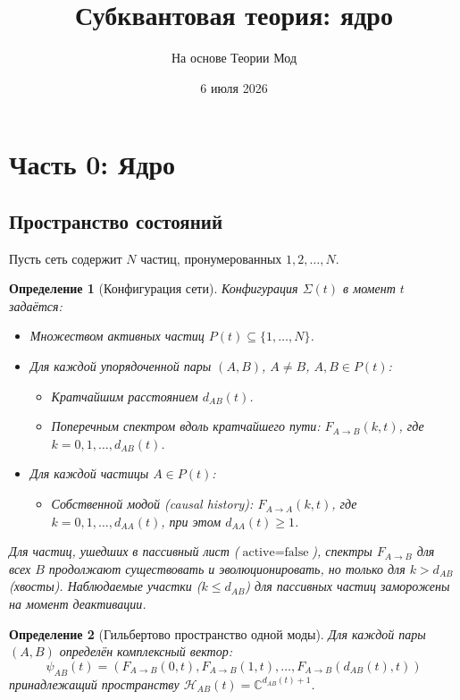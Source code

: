 \documentclass[11pt,a4paper]{article}
\title{Субквантовая теория: ядро}
\author{На основе Теории Мод}
\date{6 июля 2026}
\newtheorem{definition}{Определение}[section]
\theoremstyle{definition}
\begin{document}
\maketitle
\tableofcontents
\newpage

\section{Часть 0: Ядро}

\subsection{Пространство состояний}

Пусть сеть содержит $N$ частиц, пронумерованных $1, 2, \dots, N$.

\begin{definition}[Конфигурация сети]
Конфигурация $\Sigma(t)$ в момент $t$ задаётся:
\begin{itemize}
    \item Множеством активных частиц $P(t) \subseteq \{1, \dots, N\}$.
    \item Для каждой упорядоченной пары $(A, B)$, $A \neq B$, $A, B \in P(t)$:
    \begin{itemize}
        \item Кратчайшим расстоянием $d_{AB}(t)$.
        \item Поперечным спектром вдоль кратчайшего пути: $F_{A \to B}(k, t)$, где $k = 0, 1, \dots, d_{AB}(t)$.
    \end{itemize}
    \item Для каждой частицы $A \in P(t)$:
    \begin{itemize}
        \item Собственной модой (causal history): $F_{A \to A}(k, t)$, где $k = 0, 1, \dots, d_{AA}(t)$, при этом $d_{AA}(t) \geq 1$.
    \end{itemize}
\end{itemize}

Для частиц, ушедших в пассивный лист ($\text{active} = \text{false}$), спектры $F_{A \to B}$ для всех $B$ продолжают существовать и эволюционировать, но только для $k > d_{AB}$ (хвосты). Наблюдаемые участки ($k \leq d_{AB}$) для пассивных частиц заморожены на момент деактивации.
\end{definition}

\begin{definition}[Гильбертово пространство одной моды]
Для каждой пары $(A, B)$ определён комплексный вектор:
\begin{equation}
    \psi_{AB}(t) = (F_{A \to B}(0, t), F_{A \to B}(1, t), \dots, F_{A \to B}(d_{AB}(t), t))
\end{equation}
принадлежащий пространству $\mathcal{H}_{AB}(t) = \mathbb{C}^{d_{AB}(t)+1}$.
\end{definition}
\end{document}
